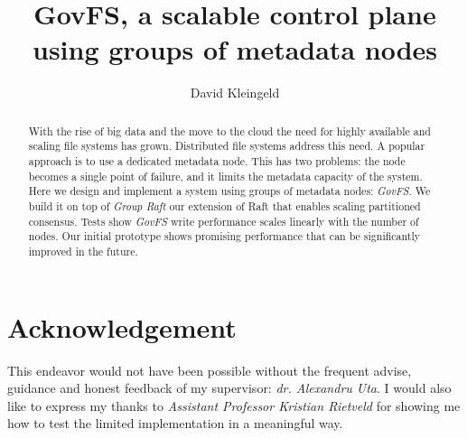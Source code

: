 \documentclass[lang=en, hanging-titles=true]{skrapport}
\title{GovFS, a scalable control plane using groups of metadata nodes}
\author[opensource@davidsk.dev]{David Kleingeld}
\begin{document}
\begin{titlepage}
\maketitle

\begin{abstract}
With the rise of big data and the move to the cloud the need for highly available and scaling file systems has grown. Distributed file systems address this need. A popular approach is to use a dedicated metadata node. This has two problems: the node becomes a single point of failure, and it limits the metadata capacity of the system. Here we design and implement a system using groups of metadata nodes: \textit{GovFS}. We build it on top of \textit{Group Raft} our extension of Raft that enables scaling partitioned consensus. Tests show \textit{GovFS} write performance scales linearly with the number of nodes. Our initial prototype shows promising performance that can be significantly improved in the future.
\end{abstract}
\end{titlepage}

\section*{Acknowledgement}
This endeavor would not have been possible without the frequent advise, guidance and honest feedback of my supervisor: \emph{dr. Alexandru Uta}. 
I would also like to express my thanks to \emph{Assistant Professor Kristian Rietveld} for showing me how to test the limited implementation in a meaningful way.

\tableofcontents
\restoregeometry
\clearpage

\newcommand{\zookeeper}{ZooKeeper}
\newcommand{\raft}{Raft}
\newcommand{\paxos}{Paxos}
\newcommand{\multipaxos}{Multi-Paxos}
\newcommand{\ceph}{Ceph}
\newcommand{\zab}{Zab}
\end{document}
